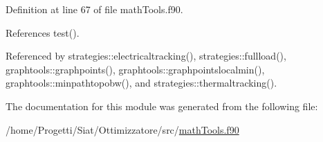 Definition at line 67 of file math\-Tools.\-f90.



References test().



Referenced by strategies\-::electricaltracking(), strategies\-::fullload(), graphtools\-::graphpoints(), graphtools\-::graphpointslocalmin(), graphtools\-::minpathtopobw(), and strategies\-::thermaltracking().



The documentation for this module was generated from the following file\-:\begin{DoxyCompactItemize}
\item 
/home/\-Progetti/\-Siat/\-Ottimizzatore/src/\hyperlink{math_tools_8f90}{math\-Tools.\-f90}\end{DoxyCompactItemize}
